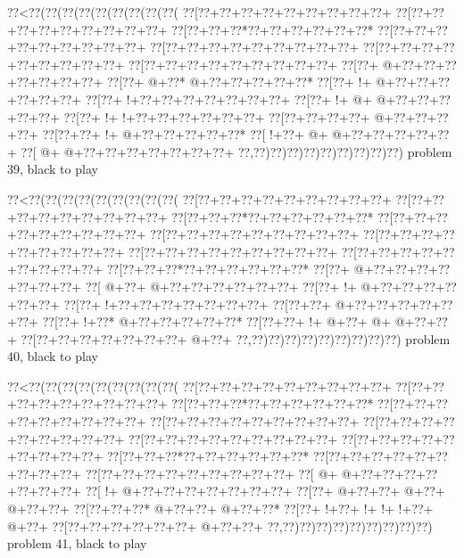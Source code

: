 \vbox{\vbox{\goo
\0??<\0??(\0??(\0??(\0??(\0??(\0??(\0??(\0??(\0??(
\0??[\0??+\0??+\0??+\0??+\0??+\0??+\0??+\0??+\0??+
\0??[\0??+\0??+\0??+\0??+\0??+\0??+\0??+\0??+\0??+
\0??[\0??+\0??+\0??*\0??+\0??+\0??+\0??+\0??+\0??*
\0??[\0??+\0??+\0??+\0??+\0??+\0??+\0??+\0??+\0??+
\0??[\0??+\0??+\0??+\0??+\0??+\0??+\0??+\0??+\0??+
\0??[\0??+\0??+\0??+\0??+\0??+\0??+\0??+\0??+\0??+
\0??[\0??+\0??+\0??+\0??+\0??+\0??+\0??+\0??+\0??+
\0??[\0??+\- @+\0??+\0??+\0??+\0??+\0??+\0??+\0??+
\0??[\0??+\- @+\0??*\- @+\0??+\0??+\0??+\0??+\0??*
\0??[\0??+\- !+\- @+\0??+\0??+\0??+\0??+\0??+\0??+
\0??[\0??+\- !+\0??+\0??+\0??+\0??+\0??+\0??+\0??+
\0??[\0??+\- !+\- @+\- @+\0??+\0??+\0??+\0??+\0??+
\0??[\0??+\- !+\- !+\0??+\0??+\0??+\0??+\0??+\0??+
\0??[\0??+\0??+\0??+\0??+\- @+\0??+\0??+\0??+\0??+
\0??[\0??+\0??+\- !+\- @+\0??+\0??+\0??+\0??+\0??*
\0??[\- !+\0??+\- @+\- @+\0??+\0??+\0??+\0??+\0??+
\0??[\- @+\- @+\0??+\0??+\0??+\0??+\0??+\0??+\0??+
\0??,\0??)\0??)\0??)\0??)\0??)\0??)\0??)\0??)\0??)
}
\hfil problem 39, black to play\hfil\break
}

\vbox{\vbox{\goo
\0??<\0??(\0??(\0??(\0??(\0??(\0??(\0??(\0??(\0??(
\0??[\0??+\0??+\0??+\0??+\0??+\0??+\0??+\0??+\0??+
\0??[\0??+\0??+\0??+\0??+\0??+\0??+\0??+\0??+\0??+
\0??[\0??+\0??+\0??*\0??+\0??+\0??+\0??+\0??+\0??*
\0??[\0??+\0??+\0??+\0??+\0??+\0??+\0??+\0??+\0??+
\0??[\0??+\0??+\0??+\0??+\0??+\0??+\0??+\0??+\0??+
\0??[\0??+\0??+\0??+\0??+\0??+\0??+\0??+\0??+\0??+
\0??[\0??+\0??+\0??+\0??+\0??+\0??+\0??+\0??+\0??+
\0??[\0??+\0??+\0??+\0??+\0??+\0??+\0??+\0??+\0??+
\0??[\0??+\0??+\0??*\0??+\0??+\0??+\0??+\0??+\0??*
\0??[\0??+\- @+\0??+\0??+\0??+\0??+\0??+\0??+\0??+
\0??[\- @+\0??+\- @+\0??+\0??+\0??+\0??+\0??+\0??+
\0??[\0??+\- !+\- @+\0??+\0??+\0??+\0??+\0??+\0??+
\0??[\0??+\- !+\0??+\0??+\0??+\0??+\0??+\0??+\0??+
\0??[\0??+\0??+\- @+\0??+\0??+\0??+\0??+\0??+\0??+
\0??[\0??+\- !+\0??*\- @+\0??+\0??+\0??+\0??+\0??*
\0??[\0??+\0??+\- !+\- @+\0??+\- @+\- @+\0??+\0??+
\0??[\0??+\0??+\0??+\0??+\0??+\0??+\0??+\- @+\0??+
\0??,\0??)\0??)\0??)\0??)\0??)\0??)\0??)\0??)\0??)
}
\hfil problem 40, black to play\hfil\break
}

\vbox{\vbox{\goo
\0??<\0??(\0??(\0??(\0??(\0??(\0??(\0??(\0??(\0??(
\0??[\0??+\0??+\0??+\0??+\0??+\0??+\0??+\0??+\0??+
\0??[\0??+\0??+\0??+\0??+\0??+\0??+\0??+\0??+\0??+
\0??[\0??+\0??+\0??*\0??+\0??+\0??+\0??+\0??+\0??*
\0??[\0??+\0??+\0??+\0??+\0??+\0??+\0??+\0??+\0??+
\0??[\0??+\0??+\0??+\0??+\0??+\0??+\0??+\0??+\0??+
\0??[\0??+\0??+\0??+\0??+\0??+\0??+\0??+\0??+\0??+
\0??[\0??+\0??+\0??+\0??+\0??+\0??+\0??+\0??+\0??+
\0??[\0??+\0??+\0??+\0??+\0??+\0??+\0??+\0??+\0??+
\0??[\0??+\0??+\0??*\0??+\0??+\0??+\0??+\0??+\0??*
\0??[\0??+\0??+\0??+\0??+\0??+\0??+\0??+\0??+\0??+
\0??[\0??+\0??+\0??+\0??+\0??+\0??+\0??+\0??+\0??+
\0??[\- @+\- @+\0??+\0??+\0??+\0??+\0??+\0??+\0??+
\0??[\- !+\- @+\0??+\0??+\0??+\0??+\0??+\0??+\0??+
\0??[\0??+\- @+\0??+\0??+\- @+\0??+\- @+\0??+\0??+
\0??[\0??+\0??+\0??*\- @+\0??+\0??+\- @+\0??+\0??*
\0??[\0??+\- !+\0??+\- !+\- !+\- !+\0??+\- @+\0??+
\0??[\0??+\0??+\0??+\0??+\0??+\0??+\- @+\0??+\0??+
\0??,\0??)\0??)\0??)\0??)\0??)\0??)\0??)\0??)\0??)
}
\hfil problem 41, black to play\hfil\break
}

